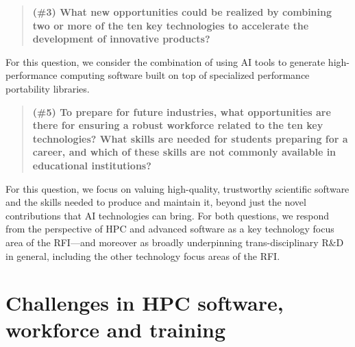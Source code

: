 \begin{quote} 
{\bf (\#3) What new opportunities could be realized by combining two or more of the ten key technologies to accelerate the development of innovative products?}
\end{quote}
For this question, we consider the combination of using AI tools to generate high-performance computing software built on top of specialized performance portability libraries.  
\begin{quote} 
{\bf (\#5) To prepare for future industries, what opportunities are there for ensuring a robust workforce related to the ten key technologies?  What skills are needed for students preparing for a career, and which of these skills are not commonly available in educational institutions? }
\end{quote}

For this question, we focus on valuing high-quality, trustworthy scientific software and the skills needed to produce and maintain it, beyond just the novel contributions that AI technologies can bring.  For both questions, we respond from the perspective of HPC and advanced software as a key technology focus area of the RFI---and moreover as broadly underpinning trans-disciplinary R\&D in general, including the other technology focus areas of the RFI.


\section*{Challenges in HPC software, workforce and training}

\iffalse
Traditional simulation and modeling continue to drive exponentially increasing demand for HPC due to requirements for higher resolution, increased fidelity, and multiphysics/multiscale coupling; at the same time, new HPC workloads are also emerging. The explosion of data from sensors, detectors, accelerators, microscopes, telescopes and sequencers is overwhelming local computing capabilities, as well as scientists’ ability to move, manage, store and analyze the data. New communities and large-scale collaborations developing around these experimental instruments require novel modes of interacting with HPC systems. For example, application teams incorporating large-scale data often have complex software dependencies requiring specific versions and software instances, which must be validated and tested before use. The teams typically have complex workflow requirements, with a scientific pipeline potentially starting and ending outside a computational facility, meaning workflow and scheduler software become eminently important. Furthermore, the increasing use of artificial intelligence (AI) in both large-scale simulations and experimental data analysis is driving changes in the traditional HPC software stack. For example, AI software products developed in industry are being ported and optimized for HPC systems, while new research is under way on AI software to serve the unique needs of science.
\fi

